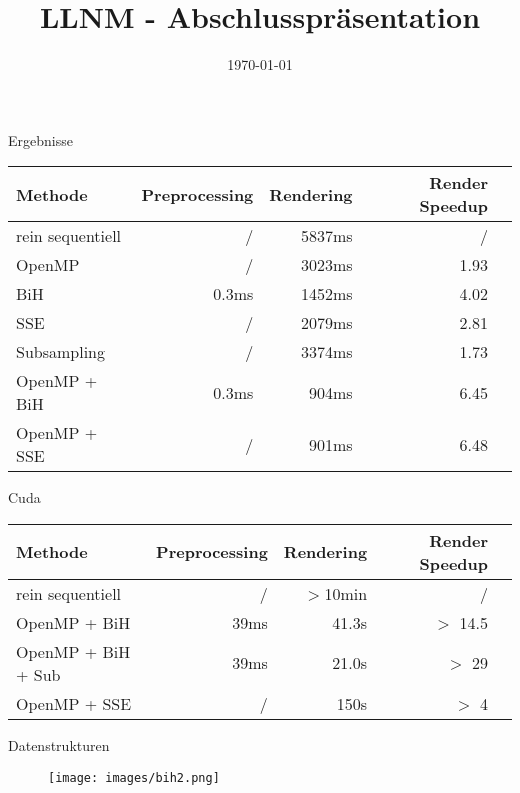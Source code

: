 


\title[LLNM]{LLNM - Abschlusspräsentation}
\subtitle{}
\date{\today}

	\begin{frame}
		\titlepage
	\end{frame}
	\begin{frame}{Ergebnisse}
		\begin{tabular}{l*{4}{r}}
		Methode           & Preprocessing & Rendering & Render Speedup \\%
		\hline
		rein sequentiell  & /      & 5837ms & /      \\%
		OpenMP            & /      & 3023ms & 1.93   \\%
		BiH               & 0.3ms  & 1452ms & 4.02   \\%
		SSE               & /      & 2079ms & 2.81   \\%
		Subsampling       & /      & 3374ms & 1.73   \\%
		OpenMP + BiH      & 0.3ms  &  904ms & 6.45   \\%
		OpenMP + SSE      & /      &  901ms & 6.48   \\%
		\end{tabular}
	\end{frame}
	\begin{frame}{Cuda}
		\begin{tabular}{l*{4}{r}}
		Methode           & Preprocessing & Rendering & Render Speedup \\%
		\hline
		rein sequentiell  & /      & $>$10min & /        \\
		OpenMP + BiH      & 39ms   & 41.3s    & $>$ 14.5 \\
		OpenMP + BiH + Sub  & 39ms   & 21.0s    & $>$ 29 \\
		OpenMP + SSE      & /      & 150s     & $>$ 4    \\
		\end{tabular}
	\end{frame}
	\begin{frame}{Datenstrukturen}
		\begin{figure}[ht]
		\texttt{[image: images/bih2.png]}
		\end{figure}
	\end{frame}

